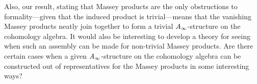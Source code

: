 Also, our result, stating that Massey products are the only obstructions to formality---given that the induced product is trivial---means that the vanishing Massey products neatly join together to form a trivial $A_{\infty}$-structure on the cohomology algebra. It would also be interesting to develop a theory for seeing when such an assembly can be made for non-trivial Massey products. Are there certain cases when a given $A_{\infty}$-structure on the cohomology algebra can be constructed out of representatives for the Massey products in some interesting ways? 